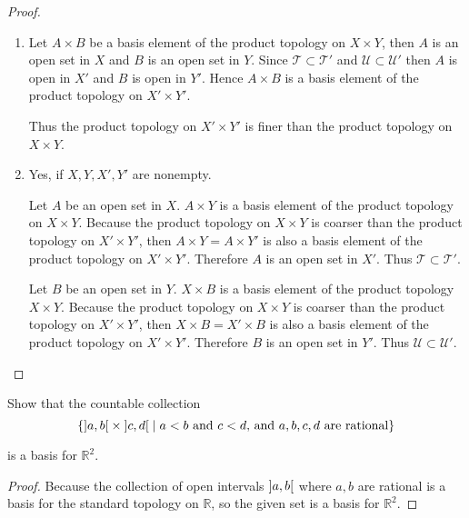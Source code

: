 \begin{proof}
    \begin{enumerate}[label={(\alph*)}]
        \item Let $A\times B$ be a basis element of the product topology on $X\times Y$, then $A$ is an open set in $X$ and $B$ is an open set in $Y$. Since $\mathscr{T} \subset \mathscr{T}'$ and $\mathscr{U} \subset \mathscr{U}'$ then $A$ is open in $X'$ and $B$ is open in $Y'$. Hence $A\times B$ is a basis element of the product topology on $X'\times Y'$.

              Thus the product topology on $X'\times Y'$ is finer than the product topology on $X\times Y$.
        \item Yes, if $X, Y, X', Y'$ are nonempty.

              Let $A$ be an open set in $X$. $A\times Y$ is a basis element of the product topology on $X\times Y$. Because the product topology on $X\times Y$ is coarser than the product topology on $X'\times Y'$, then $A\times Y = A\times Y'$ is also a basis element of the product topology on $X'\times Y'$. Therefore $A$ is an open set in $X'$. Thus $\mathscr{T}\subset \mathscr{T}'$.

              Let $B$ be an open set in $Y$. $X\times B$ is a basis element of the product topology $X\times Y$. Because the product topology on $X\times Y$ is coarser than the product topology on $X'\times Y'$, then $X\times B = X'\times B$ is also a basis element of the product topology on $X'\times Y'$. Therefore $B$ is an open set in $Y'$. Thus $\mathscr{U}\subset\mathscr{U}'$.
    \end{enumerate}
\end{proof}

\begin{exercise}\label{chapter2:section16:exercise6}
    Show that the countable collection
    \[
        \{ \left]{a, b}\right[\times \left]{c, d}\right[ \mid \text{$a < b$ and $c < d$, and $a, b, c, d$ are rational} \}
    \]

    is a basis for $\mathbb{R}^{2}$.
\end{exercise}

\begin{proof}
    Because the collection of open intervals $\left]{a, b}\right[$ where $a, b$ are rational is a basis for the standard topology on $\mathbb{R}$, so the given set is a basis for $\mathbb{R}^{2}$.
\end{proof}


